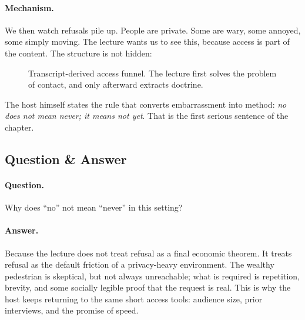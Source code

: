 \paragraph{Mechanism.} We then watch refusals pile up. People are private. Some are wary, some annoyed, some simply moving. The lecture wants us to see this, because access is part of the content. The structure is not hidden:

\begin{figure}[h]
\centering
{}
\caption{Transcript-derived access funnel. The lecture first solves the problem of contact, and only afterward extracts doctrine.}
\end{figure}

The host himself states the rule that converts embarrassment into method: \emph{no does not mean never; it means not yet}. That is the first serious sentence of the chapter.

\subsection{Question \& Answer}

\paragraph{Question.} Why does ``no'' not mean ``never'' in this setting?

\paragraph{Answer.} Because the lecture does not treat refusal as a final economic theorem. It treats refusal as the default friction of a privacy-heavy environment. The wealthy pedestrian is skeptical, but not always unreachable; what is required is repetition, brevity, and some socially legible proof that the request is real. This is why the host keeps returning to the same short access tools: audience size, prior interviews, and the promise of speed.

